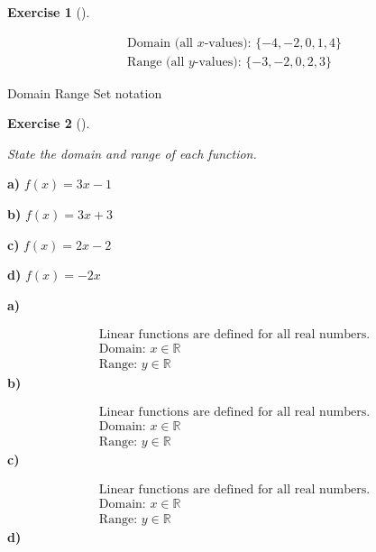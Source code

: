 \documentclass[
  letterpaper,
  DIV=11,
  numbers=noendperiod]{scrreprt}
\theoremstyle{definition}
\newtheorem{exercise}{Exercise}[chapter]
\theoremstyle{remark}
\begin{document}
\begin{exercise}[]
\begin{tcolorbox}
\[
\begin{aligned}
\text{Domain (all }x\text{-values): } \{-4, -2, 0, 1, 4\} \\[4pt] \text{Range (all }y\text{-values): } \{-3, -2, 0, 2, 3\}
\end{aligned}
\]

\end{tcolorbox}

{Domain} {Range} {Set notation}

\end{exercise}

\begin{exercise}[]\protect\hypertarget{exr-u7-6}{}\label{exr-u7-6}

\emph{State the domain and range of each function.}

\textbf{a)} \(\displaystyle f(x) = 3x - 1\)

\textbf{b)} \(\displaystyle f(x) = 3x + 3\)

\textbf{c)} \(\displaystyle f(x) = 2x - 2\)

\textbf{d)} \(\displaystyle f(x) = -2x\)

\begin{tcolorbox}[enhanced jigsaw, opacitybacktitle=0.6, coltitle=black, arc=.35mm, colframe=quarto-callout-tip-color-frame, colback=white, bottomrule=.15mm, left=2mm, colbacktitle=quarto-callout-tip-color!10!white, titlerule=0mm, opacityback=0, title=\textcolor{quarto-callout-tip-color}{\faLightbulb}\hspace{0.5em}{🔍 View Solutions}, leftrule=.75mm, breakable, rightrule=.15mm, bottomtitle=1mm, toptitle=1mm, toprule=.15mm]

\textbf{a)}

\[
\begin{aligned}
\text{Linear functions are defined for all real numbers.} \\[4pt] \text{Domain: } x \in \mathbb{R} \\[4pt] \text{Range: } y \in \mathbb{R}
\end{aligned}
\] \textbf{b)}

\[
\begin{aligned}
\text{Linear functions are defined for all real numbers.} \\[4pt] \text{Domain: } x \in \mathbb{R} \\[4pt] \text{Range: } y \in \mathbb{R}
\end{aligned}
\] \textbf{c)}

\[
\begin{aligned}
\text{Linear functions are defined for all real numbers.} \\[4pt] \text{Domain: } x \in \mathbb{R} \\[4pt] \text{Range: } y \in \mathbb{R}
\end{aligned}
\] \textbf{d)}


\end{tcolorbox}
\end{exercise}
\end{document}

